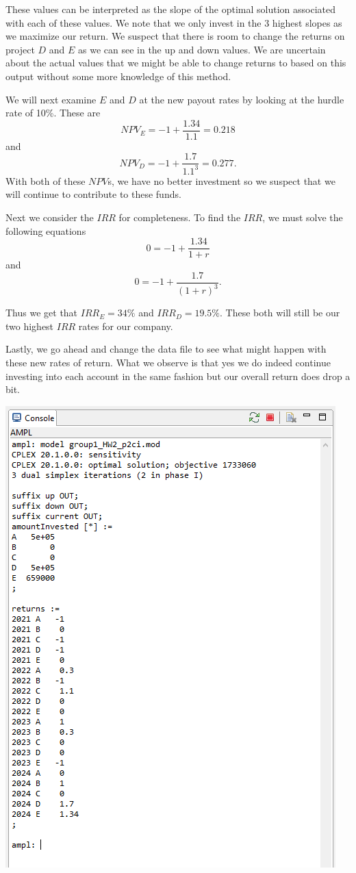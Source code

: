 \documentclass[11pt]{article}
\begin{document}
\begin{enumerate}
\begin{enumerate}
These values can be interpreted as the slope of the optimal solution associated with each of these values.  We note that we only invest in the 3 highest slopes as we maximize our return.  We suspect that there is room to change the returns on project $D$ and $E$ as we can see in the up and down values.  We are uncertain about the actual values that we might be able to change returns to based on this output without some more knowledge of this method.

We will next examine $E$ and $D$ at the new payout rates by looking at the hurdle rate of 10\%.  These are 
\[
NPV_E = -1+\frac{1.34}{1.1} = 0.218
\]
and
\[
NPV_D = -1+\frac{1.7}{1.1^3} = 0.277.
\]
With both of these $NPV$s, we have no better investment so we suspect that we will continue to contribute to these funds.

Next we consider the $IRR$ for completeness.  To find the $IRR$, we must solve the following equations
\[
0 = -1+\frac{1.34}{1+r}
\]
and 
\[
0 = -1 +\frac{1.7}{(1+r)^3}.
\]

Thus we get that $IRR_E = 34\%$ and $IRR_D = 19.5\%$.  These both will still be our two highest $IRR$ rates for our company.

Lastly, we go ahead and change the data file to see what might happen with these new rates of return.  What we observe is that yes we do indeed continue investing into each account in the same fashion but our overall return does drop a bit.

\includegraphics[width = .9\textwidth]{output2ci.png}




\end{enumerate}
\end{enumerate}
\end{document}
